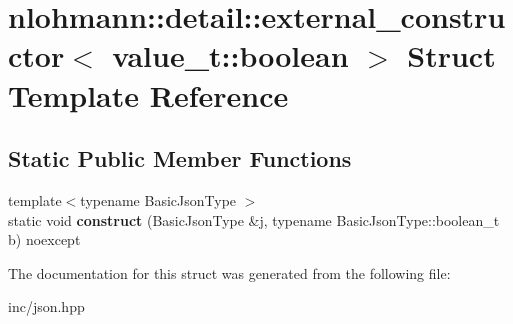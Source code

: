 \hypertarget{structnlohmann_1_1detail_1_1external__constructor_3_01value__t_1_1boolean_01_4}{}\section{nlohmann\+:\+:detail\+:\+:external\+\_\+constructor$<$ value\+\_\+t\+:\+:boolean $>$ Struct Template Reference}
\label{structnlohmann_1_1detail_1_1external__constructor_3_01value__t_1_1boolean_01_4}
\subsection*{Static Public Member Functions}
\begin{DoxyCompactItemize}
\item 
{\footnotesize template$<$typename Basic\+Json\+Type $>$ }\\static void {\bfseries construct} (Basic\+Json\+Type \&j, typename Basic\+Json\+Type\+::boolean\+\_\+t b) noexcept\hypertarget{structnlohmann_1_1detail_1_1external__constructor_3_01value__t_1_1boolean_01_4_a867122bcf0856c757bd6bcbfb8be74bc}{}\label{structnlohmann_1_1detail_1_1external__constructor_3_01value__t_1_1boolean_01_4_a867122bcf0856c757bd6bcbfb8be74bc}

\end{DoxyCompactItemize}


The documentation for this struct was generated from the following file\+:\begin{DoxyCompactItemize}
\item 
inc/json.\+hpp\end{DoxyCompactItemize}
